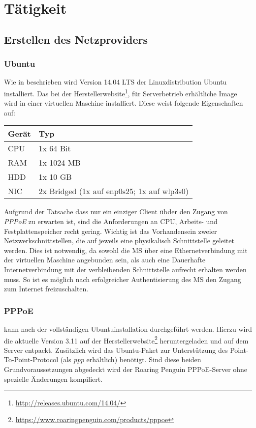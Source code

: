 \section{Tätigkeit}
	\subsection{Erstellen des Netzproviders}
		\subsubsection{Ubuntu}
		Wie in  beschrieben wird Version 14.04 LTS
		der Linuxdistribution Ubuntu installiert. Das bei der Herstellerwebsite\footnote{\url{http://releases.ubuntu.com/14.04/}},
		für Serverbetrieb erhältliche Image wird in einer virtuellen Maschine installiert.
		Diese weist folgende Eigenschaften auf:

		\begin{tabularx}{\textwidth}{|l|X|}
    	\hline
      		\textbf{Gerät} & \textbf{Typ} \\
    	\hline
    	\hline
    		CPU & 1x 64 Bit \\
    	\hline
    	\hline
    		RAM & 1x 1024 MB \\
    	\hline
    	\hline
    		HDD & 1x 10 GB \\
    	\hline
    	\hline
    		NIC & 2x Bridged (1x auf enp0s25; 1x auf wlp3s0) \\
    	\hline
    	\end{tabularx}

    	Aufgrund der Tatsache dass nur ein einziger Client übder den Zugang von \textit{PPPoE}
    	zu erwarten ist, sind die Anforderungen an CPU, Arbeits- und Festplattenspeicher
    	recht gering. Wichtig ist das Vorhandensein zweier Netzwerkschnittstellen, die
    	auf jeweils eine physikalisch Schnittstelle geleitet werden. Dies ist notwendig,
    	da sowohl die \ac{MS} über eine Ethernetverbindung mit der virtuellen Maschine angebunden sein,
    	als auch eine Dauerhafte Internetverbindung mit der verbleibenden Schnittstelle
    	aufrecht erhalten werden muss. So ist es möglich nach erfolgreicher Authentisierung
    	des \ac{MS} den Zugang zum Internet freizuschalten.

    	\subsubsection{PPPoE}
    	kann nach der vollständigen Ubuntuinstallation durchgeführt werden. Hierzu wird die aktuelle
    	Version 3.11 auf der Herstellerwebsite\footnote{\url{https://www.roaringpenguin.com/products/pppoe}}
    	heruntergeladen und auf dem Server entpackt. Zusätzlich wird das Ubuntu-Paket zur Unterstützung
    	des Point-To-Point-Protocol (als \textit{ppp} erhältlich) benötigt. Sind diese beiden Grundvoraussetzungen
    	abgedeckt wird der Roaring Penguin PPPoE-Server ohne spezielle Änderungen kompiliert.

